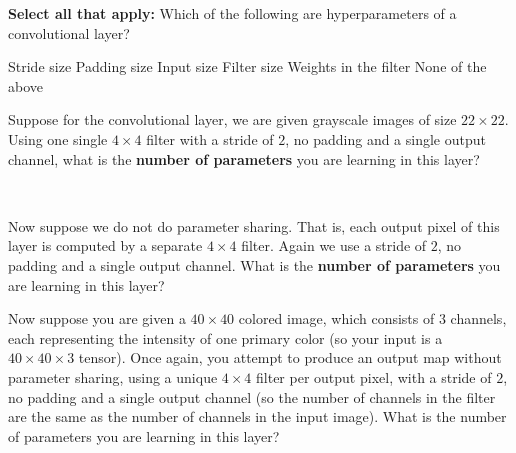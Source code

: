 \documentclass[11pt,addpoints,answers]{exam}
\newcommand{\sall}{\textbf{Select all that apply: }}
\begin{document}
\begin{questions}
\begin{parts}
\begin{subparts}
    \vspace{4mm}
    
    \subpart[1] \sall Which of the following are hyperparameters of a convolutional layer?
    \checkboxchar{$\Box$} \checkedchar{$\blacksquare$}
    \begin{checkboxes}
        \choice Stride size
        \choice Padding size
        \choice Input size
        \choice Filter size
        \choice Weights in the filter
        \choice None of the above
    \end{checkboxes}
    
    \vspace{4mm}

    \subpart[1] Suppose for the convolutional layer, we are given grayscale images of size $22\times 22$. Using one single $4 \times 4$ filter with a stride of $2$, no padding and a single output channel, what is the \textbf{number of parameters} you are learning in this layer? \\
    \begin{your_solution}[height=2cm,width=4cm]
    \end{your_solution}\\
    
    \vspace{4mm}
    
    \subpart[1] Now suppose we do not do parameter sharing. That is, each output pixel of this layer is computed by a separate $4 \times 4$ filter. Again we use a stride of $2$, no padding and a single output channel. What is the \textbf{number of parameters} you are learning in this layer? \\
    \begin{your_solution}[height=2cm,width=4cm]
    \end{your_solution}

    \newpage
    
    \subpart[1] Now suppose you are given a $40 \times 40$ colored image, which consists of $3$ channels, each representing the intensity of one primary color (so your input is a $40 \times 40 \times 3$ tensor). Once again, you attempt to produce an output map without parameter sharing, using a unique $4 \times 4$ filter per output pixel, with a stride of $2$, no padding and a single output channel (so the number of channels in the filter are the same as the number of channels in the input image). What is the number of parameters you are learning in this layer? \\
    \begin{your_solution}[height=2cm,width=4cm]
    \end{your_solution}\\


\end{subparts}
\end{parts}
\end{questions}
\end{document}
